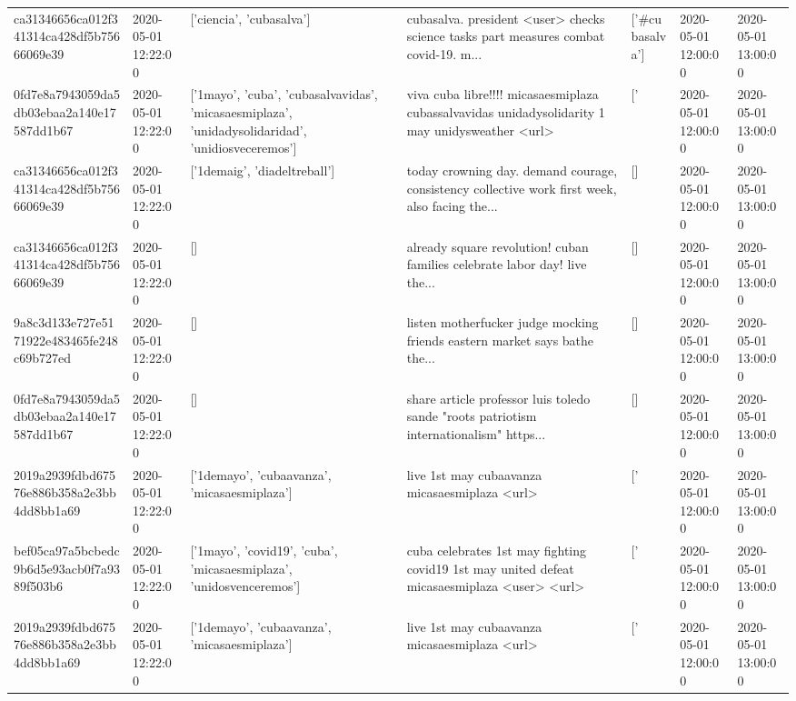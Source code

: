 \begin{tabular}{lllllll}
ca31346656ca012f341314ca428df5b75666069e39 & 2020-05-01 12:22:00 & ['ciencia', 'cubasalva'] & cubasalva. president <user> checks science tasks part measures combat covid-19. m... & ['#cubasalva'] & 2020-05-01 12:00:00 & 2020-05-01 13:00:00 \\
0fd7e8a7943059da5db03ebaa2a140e17587dd1b67 & 2020-05-01 12:22:00 & ['1mayo', 'cuba', 'cubasalvavidas', 'micasaesmiplaza', 'unidadysolidaridad', 'unidiosveceremos'] & viva cuba libre!!!! micasaesmiplaza cubassalvavidas unidadysolidarity 1 may unidysweather <url> & ['#1mayo', '#cuba', '#cubasalvavidas', '#micasaesmiplaza'] & 2020-05-01 12:00:00 & 2020-05-01 13:00:00 \\
ca31346656ca012f341314ca428df5b75666069e39 & 2020-05-01 12:22:00 & ['1demaig', 'diadeltreball'] & today crowning day. demand courage, consistency collective work first week, also facing the... & [] & 2020-05-01 12:00:00 & 2020-05-01 13:00:00 \\
ca31346656ca012f341314ca428df5b75666069e39 & 2020-05-01 12:22:00 & [] & already square revolution! cuban families celebrate labor day! live the... & [] & 2020-05-01 12:00:00 & 2020-05-01 13:00:00 \\
9a8c3d133e727e5171922e483465fe248c69b727ed & 2020-05-01 12:22:00 & [] & listen motherfucker judge mocking friends eastern market says bathe the... & [] & 2020-05-01 12:00:00 & 2020-05-01 13:00:00 \\
0fd7e8a7943059da5db03ebaa2a140e17587dd1b67 & 2020-05-01 12:22:00 & [] & share article professor luis toledo sande "roots patriotism internationalism" https... & [] & 2020-05-01 12:00:00 & 2020-05-01 13:00:00 \\
2019a2939fdbd67576e886b358a2e3bb4dd8bb1a69 & 2020-05-01 12:22:00 & ['1demayo', 'cubaavanza', 'micasaesmiplaza'] & live 1st may cubaavanza micasaesmiplaza <url> & ['#1demayo', '#micasaesmiplaza'] & 2020-05-01 12:00:00 & 2020-05-01 13:00:00 \\
bef05ca97a5bcbedc9b6d5e93acb0f7a9389f503b6 & 2020-05-01 12:22:00 & ['1mayo', 'covid19', 'cuba', 'micasaesmiplaza', 'unidosvenceremos'] & cuba celebrates 1st may fighting covid19 1st may united defeat micasaesmiplaza <user> <url> & ['#1mayo', '#covid19', '#cuba', '#micasaesmiplaza', '#unidosvenceremos'] & 2020-05-01 12:00:00 & 2020-05-01 13:00:00 \\
2019a2939fdbd67576e886b358a2e3bb4dd8bb1a69 & 2020-05-01 12:22:00 & ['1demayo', 'cubaavanza', 'micasaesmiplaza'] & live 1st may cubaavanza micasaesmiplaza <url> & ['#1demayo', '#micasaesmiplaza'] & 2020-05-01 12:00:00 & 2020-05-01 13:00:00 \\

\end{tabular}
